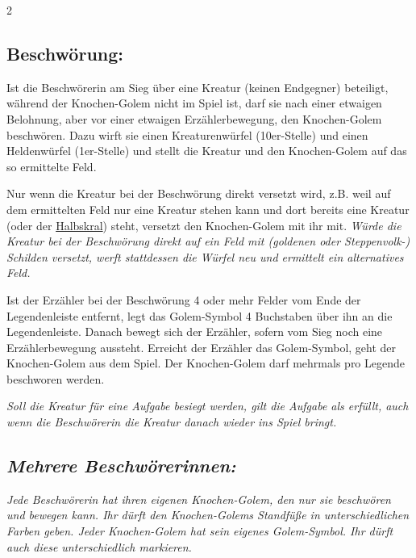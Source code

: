 \documentclass[10pt, a4paper, oneside]{book}
\newcommand{\fan}[1]{\textit{#1}}
\begin{document}
\begin{multicols*}{2}
\begin{nobgcolor}
\subsection{Beschwörung:}

Ist die Beschwörerin am Sieg über eine Kreatur (keinen Endgegner) beteiligt, während der Knochen-Golem nicht im Spiel ist, darf sie nach einer etwaigen Belohnung, aber vor einer etwaigen Erzählerbewegung, den Knochen-Golem beschwören. Dazu wirft sie einen Kreaturenwürfel (10er-Stelle) und einen Heldenwürfel (1er-Stelle) und stellt die Kreatur und den Knochen-Golem auf das so ermittelte Feld.
\supercite{dh-knochen-golem}

Nur wenn die Kreatur bei der Beschwörung direkt versetzt wird, z.B. weil auf dem ermittelten Feld nur eine Kreatur stehen kann und dort bereits eine Kreatur (oder der \hyperref[halbskral]{Halbskral}) steht, versetzt den Knochen-Golem mit ihr mit. 
\supercite{130318}
\fan{Würde die Kreatur bei der Beschwörung direkt auf ein Feld mit (goldenen \fan{oder Steppenvolk-}) Schilden versetzt, werft stattdessen die Würfel neu und ermittelt ein alternatives Feld.}

Ist der Erzähler bei der Beschwörung 4 oder mehr Felder vom Ende der Legendenleiste entfernt, legt das Golem-Symbol 4 Buchstaben über ihn an die Legendenleiste. Danach bewegt sich der Erzähler, sofern vom Sieg noch eine Erzählerbewegung aussteht. Erreicht der Erzähler das Golem-Symbol, geht der Knochen-Golem aus dem Spiel.
\supercite{dh-knochen-golem}
Der Knochen-Golem darf mehrmals pro Legende beschworen werden.

\fan{Soll die Kreatur für eine Aufgabe besiegt werden, gilt die Aufgabe als erfüllt, auch wenn die Beschwörerin die Kreatur danach wieder ins Spiel bringt.}









\subsection{\fan{Mehrere Beschwörerinnen:}}

\fan{Jede Beschwörerin hat ihren eigenen Knochen-Golem, den nur sie beschwören und bewegen kann. Ihr dürft den Knochen-Golems Standfüße in unterschiedlichen Farben geben. Jeder Knochen-Golem hat sein eigenes Golem-Symbol. Ihr dürft auch diese unterschiedlich markieren.}


\end{nobgcolor}



\end{multicols*}
\end{document}
